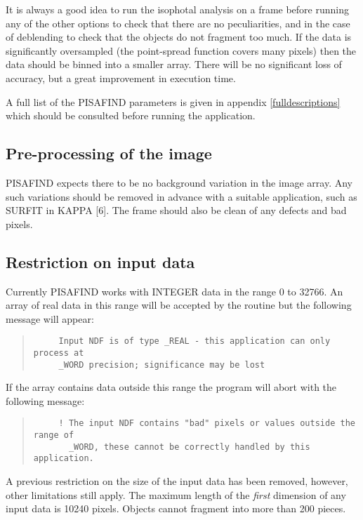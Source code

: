 It is always a good idea to run the isophotal analysis on a frame before
running any of the other options to check that there are no
peculiarities, and in the case of deblending to check that the objects
do not fragment too much. If the data is significantly oversampled (the
point-spread function covers many pixels) then the data should be binned
into a smaller array. There will be no significant loss of accuracy, but
a great improvement in execution time.

A full list of the PISAFIND parameters is given in appendix
\ref{fulldescriptions} which should be consulted before running the
application.

\subsection{Pre-processing of the image}

PISAFIND expects there to be no background variation in the image array.
Any such variations should be removed in advance with a suitable
application, such as SURFIT in KAPPA [6]. The frame should also be
clean of any defects and bad pixels.

\subsection{Restriction on input data}
Currently PISAFIND works with INTEGER data in the range 0 to 32766. An
array of real data in this range will be accepted by the routine but the
following message will appear:
\begin{quote}
\begin{verbatim}
     Input NDF is of type _REAL - this application can only process at
     _WORD precision; significance may be lost 
\end{verbatim}
\end{quote}
If the array contains data outside this range the program will abort
with the following message:
\begin{quote}
\begin{verbatim}
     ! The input NDF contains "bad" pixels or values outside the range of 
       _WORD, these cannot be correctly handled by this application. 
\end{verbatim}
\end{quote}

A previous restriction on the size of the input data has been removed,
however, other limitations still apply. The maximum length of the {\em
first} dimension of any input data is 10240 pixels. Objects cannot
fragment into more than 200 pieces.


